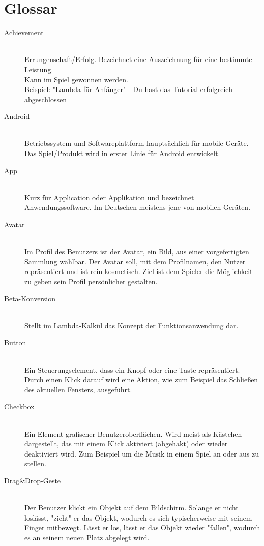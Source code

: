 \section{Glossar}

\begin{description}
	\item[Achievement] \hfill \\
	Errungenschaft/Erfolg. Bezeichnet eine Auszeichnung für eine bestimmte Leistung.\\
	Kann im Spiel gewonnen werden.\\
	Beispiel: "Lambda für Anfänger" - Du hast das Tutorial erfolgreich abgeschlossen
	
	\item[Android] \hfill \\
	Betriebssystem und Softwareplattform hauptsächlich für mobile Geräte. Das Spiel/Produkt wird in erster Linie 
	für Android entwickelt.
	
	\item[App] \hfill \\
	Kurz für Application oder Applikation und bezeichnet Anwendungssoftware. Im Deutschen meistens jene von mobilen Geräten.
	
	\item[Avatar] \hfill \\
	Im Profil des Benutzers ist der Avatar, ein Bild, aus einer vorgefertigten Sammlung wählbar.
	Der Avatar soll, mit dem Profilnamen, den Nutzer repräsentiert und ist rein kosmetisch.
	Ziel ist dem Spieler die Möglichkeit zu geben sein Profil persönlicher gestalten.
	
	\item[Beta-Konversion] \hfill \\
	Stellt im Lambda-Kalkül das Konzept der Funktionsanwendung dar.
	
	\item[Button] \hfill \\
	Ein Steuerungselement, dass ein Knopf oder eine Taste repräsentiert. Durch einen Klick darauf wird eine Aktion, wie zum Beispiel
	das Schließen des aktuellen Fensters, ausgeführt.
	
	\item[Checkbox] \hfill \\
	Ein Element grafischer Benutzeroberflächen. Wird meist als Kästchen dargestellt, das mit einem Klick aktiviert (abgehakt) oder
	wieder deaktiviert wird. Zum Beispiel um die Musik in einem Spiel an oder aus zu stellen.
	
	\item[Drag\&Drop-Geste] \hfill \\
	Der Benutzer klickt ein Objekt auf dem Bildschirm. Solange er nicht loslässt, "zieht" er das Objekt, wodurch
	es sich typischerweise mit seinem Finger mitbewegt. Lässt er los, lässt er das Objekt wieder "fallen", wodurch
	es an seinem neuen Platz abgelegt wird.
	

\end{description}
